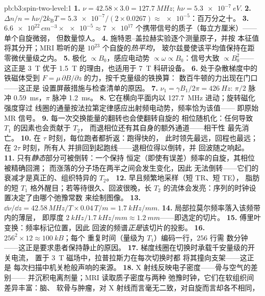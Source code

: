 \begin{solution}{pb:b3:spin-two-level:1}
\textbf{1.} $\nu = 42.58 \times 3.0 = \qty{127.7}{MHz}$; $h\nu =
\qty{5.3e-7}{eV}$.
\textbf{2.} $\Delta n/n = h\nu/2k_{\text{B}}T = \num{5.3e-7}/(2
\times 0.0267) \approx \num{e-5}$：百万分之十。
\textbf{3.} $\num{6.6e22}\,\unit{cm^{-3}} \times \num{e-5} \approx
\num{7e17}$ 个携带信号的质子（每立方厘米）——单个自旋微弱，
但数量惊人。
\textbf{4.} 施特恩–盖拉赫实验逐个测量原子，并按
本征值将其分开；MRI 聆听的是 $10^{23}$ 个自旋的\emph{热平均}，
玻尔兹曼使该平均值保持在距零微伏量级之内。
\textbf{5.} 极化 $\propto B_0$，感应电动势
$\propto \omega \propto B_0$：信号大致 $\propto B_0^2$——
这正是 \qty{3}{T} 优于 \qty{1.5}{T} 的理由，也适用于
\qty{7}{T} 科研设备。
\textbf{6.} 处于杂散梯度中的铁磁体受到
$F = \mu\,\partial B/\partial z$ 的力，按千克量级的铁换算：
数百牛顿的力出现在门口——这正是
设置屏蔽措施与检查清单的原因。
\textbf{7.} $\nu_1 = \gamma B_1/2\pi = \qty{426}{Hz}$: $\pi/2$
脉冲 \qty{0.59}{ms}，$\pi$ 脉冲 \qty{1.2}{ms}。
\textbf{8.} 它在横向平面内以
\qty{127.7}{MHz} 进动；旋转磁化强度穿过
线圈的通量按法拉第定律感应出射频电动势，频率恰为该值——
即原始 MR 信号。
\textbf{9.} 每一次交换能量的翻转也会使翻转自旋的
相位随机化：任何导致 $T_1$ 的因素也会贡献于 $T_2$，
而退相位还有其自身的额外通道——相干性
最先消亡。
\textbf{10.} 在 $\tau$ 时刻，每位跑者都折返：跑得快的，
此时领先最远，回程也最远；在 $2\tau$ 时刻，所有人
并排回到起跑线——退相位得以倒转，并
回波随之响起。
\textbf{11.} 只有\emph{静态}部分可被倒转：一个保持
恒定（即使有误差）频率的自旋，其相位被精确回溯；
而涨落的分子场在两半之间会发生变化，因此
无法倒转——它们的衰减才是真正的、组织特异的 $T_2$。
\textbf{12.} 早且频繁地采样（短 TR、短 TE），
脂肪的短 $T_1$ 格外醒目；若等待很久、回波很晚，长 $T_2$
的流体会发亮：序列的时钟设置决定了由哪个弛豫常数
来绘制图像。
\textbf{13.} $\dd\nu/\dd z = 42.58\,\unit{MHz/T} \times
0.04\,\unit{T/m} = \qty{1.7}{kHz/mm}$.
\textbf{14.} 局部拉莫尔频率落入该频带内的薄层，
即厚度 $\qty{2}{kHz}/\qty{1.7}{kHz/mm} \approx
\qty{1.2}{mm}$——即选定的切片。
\textbf{15.} 傅里叶变换：频率标记位置，因此
回波的频谱\emph{正是}该切片的投影。
\textbf{16.} $256^2 \times 12 \approx \qty{100}{kB}$；每个
重复时间（量级为 $T_1$）编码一行，$256$ 行需
数分钟——这正是要求患者保持静止的原因。
\textbf{17.} 梯度线圈在切换时承载千安量级的开关电流，
置于 \qty{3}{T} 磁场中，拉普拉斯力在每次切换时都
将其撞向支架——这正是
每次扫描中机关枪般声响的来源。
\textbf{18.} X 射线反映电子密度——骨与空气的差别——
并沉积电离剂量；MRI 读取质子密度与两种
弛豫时钟，它们在软组织间差异丰富：脑、
软骨与肿瘤，对 X 射线而言毫无二致，对自旋而言却各不相同，

\end{solution}
